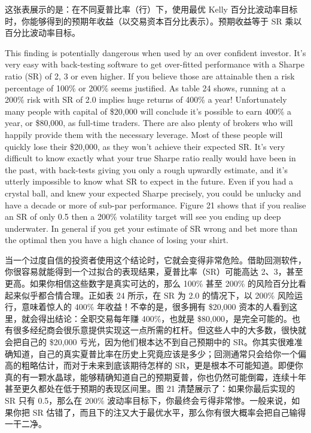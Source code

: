 \begin{chineseblock}这张表展示的是：在不同夏普比率（行）下，使用最优 Kelly 百分比波动率目标时，你能够得到的预期年收益（以交易资本百分比表示）。预期收益等于 SR 乘以百分比波动率目标。\end{chineseblock}

\bipairgap

\begin{englishblock} This finding is potentially dangerous when used by an over confident investor. It's very easy with back-testing software to get over-fitted performance with a Sharpe ratio (SR) of 2, 3 or even higher. If you believe those are attainable then a risk percentage of 100\% or 200\% seems justified. As table 24 shows, running at a 200\% risk with SR of 2.0 implies huge returns of 400\% a year! Unfortunately many people with capital of \$20,000 will conclude it's possible to earn 400\% a year, or \$80,000, as full-time traders. There are also plenty of brokers who will happily provide them with the necessary leverage. Most of these people will quickly lose their \$20,000, as they won't achieve their expected SR. It's very difficult to know exactly what your true Sharpe ratio really would have been in the past, with back-tests giving you only a rough upwardly estimate, and it's utterly impossible to know what SR to expect in the future. Even if you had a crystal ball, and knew your expected Sharpe precisely, you could be unlucky and have a decade or more of sub-par performance. Figure 21 shows that if you realise an SR of only 0.5 then a 200\% volatility target will see you ending up deep underwater. In general if you get your estimate of SR wrong and bet more than the optimal then you have a high chance of losing your shirt. \end{englishblock}

\begin{chineseblock}当一个过度自信的投资者使用这个结论时，它就会变得非常危险。借助回测软件，你很容易就能得到一个过拟合的表现结果，夏普比率（SR）可能高达 2、3，甚至更高。如果你相信这些数字是真实可达的，那么 100\% 甚至 200\% 的风险百分比看起来似乎都合情合理。正如表 24 所示，在 SR 为 2.0 的情况下，以 200\% 风险运行，意味着惊人的 400\% 年收益！不幸的是，很多拥有 \$20,000 资本的人看到这里，就会得出结论：全职交易每年赚 400\%，也就是 \$80,000，是完全可能的。也有很多经纪商会很乐意提供实现这一点所需的杠杆。但这些人中的大多数，很快就会把自己的 \$20,000 亏光，因为他们根本达不到自己预期中的 SR。你其实很难准确知道，自己的真实夏普比率在历史上究竟应该是多少；回测通常只会给你一个偏高的粗略估计，而对于未来到底该期待怎样的 SR，更是根本不可能知道。即便你真的有一颗水晶球，能够精确知道自己的预期夏普，你也仍然可能倒霉，连续十年甚至更久都处在低于预期的表现区间里。图 21 清楚展示了：如果你最后实现的 SR 只有 0.5，那么在 200\% 波动率目标下，你最终会亏得非常惨。一般来说，如果你把 SR 估错了，而且下的注又大于最优水平，那么你有很大概率会把自己输得一干二净。\end{chineseblock}

